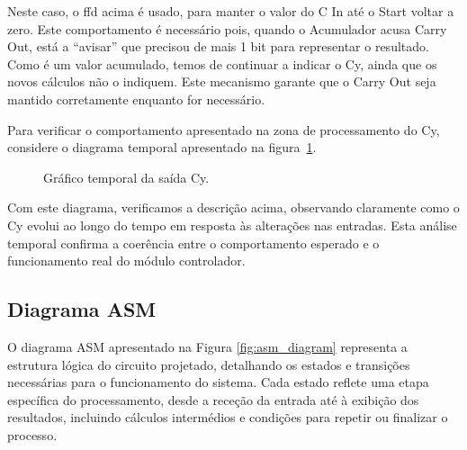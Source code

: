 Neste caso, o \Gls{ffd} acima é usado, para manter o valor do C In até o Start voltar a zero. Este comportamento é necessário pois, quando o Acumulador acusa Carry Out, está a ``avisar'' que precisou de mais 1 bit para representar o resultado. Como é um valor acumulado, temos de continuar a indicar o Cy, ainda que os novos cálculos não o indiquem. Este mecanismo garante que o Carry Out seja mantido corretamente enquanto for necessário.

Para verificar o comportamento apresentado na zona de processamento do Cy, considere o diagrama temporal apresentado na figura~\ref{graph:Cy}.

\begin{figure}[H]
    \centering
    
    \caption{Gráfico temporal da saída Cy.}\label{graph:Cy}
\end{figure}

Com este diagrama, verificamos a descrição acima, observando claramente como o Cy evolui ao longo do tempo em resposta às alterações nas entradas. Esta análise temporal confirma a coerência entre o comportamento esperado e o funcionamento real do módulo controlador.

\newpage

\subsection{Diagrama ASM}

O diagrama ASM apresentado na Figura \ref{fig:asm_diagram} representa a estrutura lógica do circuito projetado, detalhando os estados e transições necessárias para o funcionamento do sistema. Cada estado reflete uma etapa específica do processamento, desde a receção da entrada até à exibição dos resultados, incluindo cálculos intermédios e condições para repetir ou finalizar o processo.

